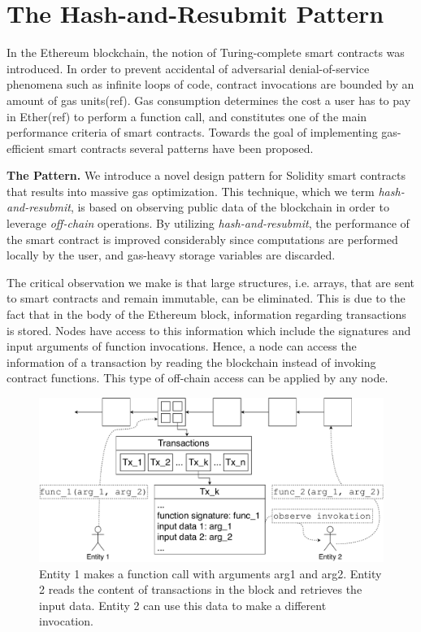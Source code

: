 \section{The Hash-and-Resubmit Pattern}

In the Ethereum blockchain, the notion of Turing-complete smart contracts was
introduced. In order to prevent accidental of adversarial denial-of-service
phenomena such as infinite loops of code, contract invocations are bounded by
an amount of gas units(ref). Gas consumption determines the cost a user has to
pay in Ether(ref) to perform a function call, and constitutes one of the main
performance criteria of smart contracts. Towards the goal of implementing
gas-efficient smart contracts several patterns have been proposed.

\noindent \textbf{The Pattern.} We introduce a novel design pattern for
Solidity smart contracts that results into massive gas optimization. This
technique, which we term \emph{hash-and-resubmit}, is based on observing public
data of the blockchain in order to leverage \emph{off-chain} operations. By
utilizing \emph{hash-and-resubmit}, the performance of the smart contract is
improved considerably since computations are performed locally by the user, and
gas-heavy storage variables are discarded.

The critical observation we make is that large structures, i.e. arrays, that
are sent to smart contracts and remain immutable, can be eliminated. This is
due to the fact that in the body of the Ethereum block, information regarding
transactions is stored. Nodes have access to this information which include the
signatures and input arguments of function invocations. Hence, a node can
access the information of a transaction by reading the blockchain instead of
invoking contract functions. This type of off-chain access can be applied by
any node.

\begin{figure}[h]
    \begin{center}
        \includegraphics[width=1\columnwidth]{figures/observer-tx.pdf}
    \end{center}
    \caption{Entity 1 makes a function call with arguments arg1 and arg2.
    Entity 2 reads the content of transactions in the block and retrieves the
    input data. Entity 2 can use this data to make a different invocation.}
    \label{fig:observe-tx}
\end{figure}

